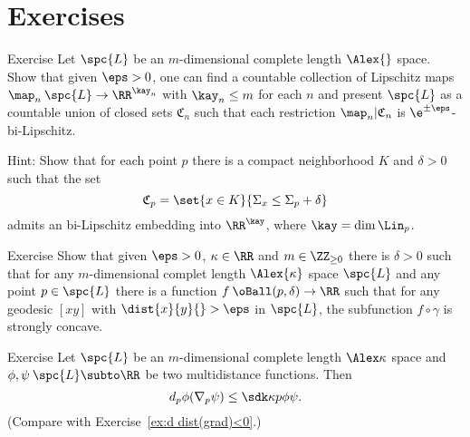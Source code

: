 \section{Exercises}

\begin{thm}{Exercise}
Let $\spc{L}$ be an $m$-dimensional complete length $\Alex{}$ space.
Show that given $\eps>0$,
one can find a countable collection of Lipschitz maps $\map_n\:\spc{L}\to \RR^{\kay_n}$ 
with $\kay_n\le m$ for each $n$
and present $\spc{L}$ as a countable union of closed sets $\mathfrak C_n$ such that each restriction 
$\map_n|\mathfrak C_n$ is $\e^{\pm\eps}$-bi-Lipschitz.
\end{thm}



Hint: Show that for each point $p$ there is a compact neighborhood $K$ and $\delta>0$ such that the set 
\[\mathfrak C_p=\set{x\in K}{\Sigma_x\le \Sigma_p+\delta}\]
admits an bi-Lipschitz embedding into $\RR^\kay$, where $\kay=\dim\Lin_p$.

\begin{thm}{Exercise}
Show that given $\eps>0$, $\kappa\in\RR$ and $m\in\ZZ_{\ge0}$ there is $\delta>0$ such that for any $m$-dimensional complet length $\Alex{\kappa}$ space $\spc{L}$ and any point $p\in\spc{L}$ there is a function $f\:\oBall(p,\delta)\to\RR$
such that for any geodesic $[xy]$ with $\dist{x}{y}{}>\eps$ in $\spc{L}$,
the subfunction $f\circ\gamma$ is strongly concave.
\end{thm}






\begin{thm}{Exercise}\label{ex:d(grad)<0}
Let $\spc{L}$ be an $m$-dimensional complete length $\Alex\kappa$ space and
$\phi,\psi\:\spc{L}\subto\RR$ be two multidistance functions.
Then 
\[d_p\phi(\nabla_p\psi)
\le
\sdk\kappa{p}{\phi}{\psi}.\]
(Compare with Exercise~\ref{ex:d dist(grad)<0}.)
\end{thm}


